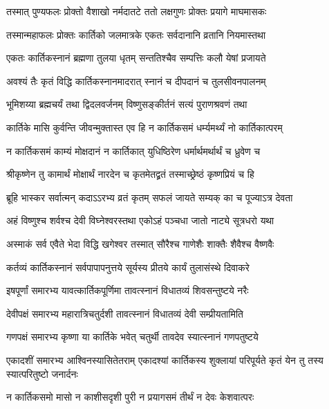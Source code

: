 \twolineshloka
{तस्मात् पुण्यफलः प्रोक्तो वैशाखो नर्मदातटे}
{ततो लक्षगुणः प्रोक्तः प्रयागे माघमासकः} %

\twolineshloka
{तस्मान्महाफलः प्रोक्तः कार्तिको जलमात्रके}
{एकतः सर्वदानानि व्रतानि नियमास्तथा} %

\twolineshloka
{एकतः कार्तिकस्नानं ब्रह्मणा तुलया धृतम्}
{सन्ततिश्चैव सम्पत्तिः कलौ येषां प्रजायते} %

\twolineshloka
{अवश्यं तैः कृतं विद्धि कार्तिकस्नानमादरात्}
{स्नानं च दीपदानं च तुलसीवनपालनम्} %

\twolineshloka
{भूमिशय्या ब्रह्मचर्यं तथा द्विदलवर्जनम्}
{विष्णुसङ्कीर्तनं सत्यं पुराणश्रवणं तथा} %

\twolineshloka
{कार्तिके मासि कुर्वन्ति जीवन्मुक्तास्त एव हि}
{न कार्तिकसमं धर्म्यमर्थ्यं नो कार्तिकात्परम्} %

\twolineshloka
{न कार्तिकसमं काम्यं मोक्षदानं न कार्तिकात्}
{युधिष्ठिरेण धर्मार्थमर्थार्थं च ध्रुवेण च} %

\twolineshloka
{श्रीकृष्णेन तु कामार्थं मोक्षार्थं नारदेन च}
{कृतमेतद्व्रतं तस्माच्छ्रेष्ठं कृष्णप्रियं च हि} %


\twolineshloka
{ब्रूहि भास्कर सर्वात्मन् कदाऽऽरभ्य व्रतं कृतम्}
{सफलं जायते सम्यक् का च पूज्याऽत्र देवता} %


\twolineshloka
{अहं विष्णुश्च शर्वश्च देवी विघ्नेश्वरस्तथा}
{एकोऽहं पञ्चधा जातो नाट्ये सूत्रधरो यथा} %

\twolineshloka
{अस्माकं सर्व एवैते भेदा विद्धि खगेश्वर}
{तस्मात् सौरैश्च गाणेशैः शाक्तैः शैवैश्च वैष्णवैः} %

\twolineshloka
{कर्तव्यं कार्तिकस्नानं सर्वपापापनुत्तये}
{सूर्यस्य प्रीतये कार्यं तुलासंस्थे दिवाकरे} %

\twolineshloka
{इषपूर्णां समारभ्य यावत्कार्तिकपूर्णिमा}
{तावत्स्नानं विधातव्यं शिवसन्तुष्टये नरैः} %

\twolineshloka
{देवीपक्षं समारभ्य महारात्रिचतुर्दशी}
{तावत्स्नानं विधातव्यं देवी सम्प्रीयतामिति} %

\twolineshloka
{गणपक्षं समारभ्य कृष्णा या कार्तिके भवेत्}
{चतुर्थी तावदेव स्यात्स्नानं गणपतुष्टये} %

\threelineshloka
{एकादशीं समारभ्य आश्विनस्यासितेतराम्}
{एकादश्यां कार्तिकस्य शुक्लायां परिपूर्यते}
{कृतं येन तु तस्य स्यात्परितुष्टो जनार्दनः} %

\twolineshloka
{न कार्तिकसमो मासो न काशीसदृशी पुरी}
{न प्रयागसमं तीर्थं न देवः केशवात्परः} %

